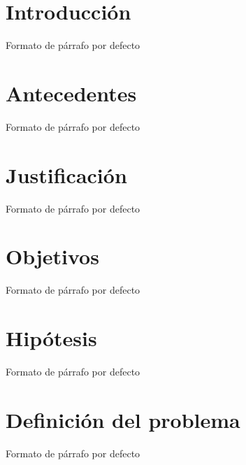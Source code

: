 \documentclass[11pt, letterpaper]{report}
\newcommand{\defaultparformat}[1]{
	{\setlength{\parskip}{2ex}
     }
}
\def \parpordefecto {Formato de párrafo por defecto}
\begin{document}
\ifdefined\CAPintroduccion
	\newpage
	\cleardoublepage
	\setcounter{page}{1}
	\chapter{Introducción}
	\ifdefined\parpordefecto
		\defaultparformat{d-introduccion}
	\else
		
	\fi
\fi

\ifdefined\CAPantecedentes
	\newpage
	\chapter{Antecedentes}
	\ifdefined\parpordefecto
    	\defaultparformat{e-antecedentes}
    \else
    	
    \fi  
\fi

\ifdefined\CAPjustificacion
	\newpage
	\chapter{Justificación}
	\ifdefined\parpordefecto
		\defaultparformat{f-justificacion}
	\else
		
	\fi
\fi

\ifdefined\CAPobjetivos
	\newpage
	\chapter{Objetivos}
	\ifdefined\parpordefecto
		\defaultparformat{g-objetivos}
	\else
		
	\fi
\fi

\ifdefined\CAPhipotesis
	\newpage
	\chapter{Hipótesis}
	\ifdefined\parpordefecto
    	\defaultparformat{h-hipotesis-definicion-alcance}
    \else
    	
    \fi
\fi

\ifdefined\CAPdefinicion
    \newpage
	\chapter{Definición del problema}
	\ifdefined\parpordefecto
    	\defaultparformat{h-hipotesis-definicion-alcance}
    \else
    	
    \fi
\fi
\end{document}
